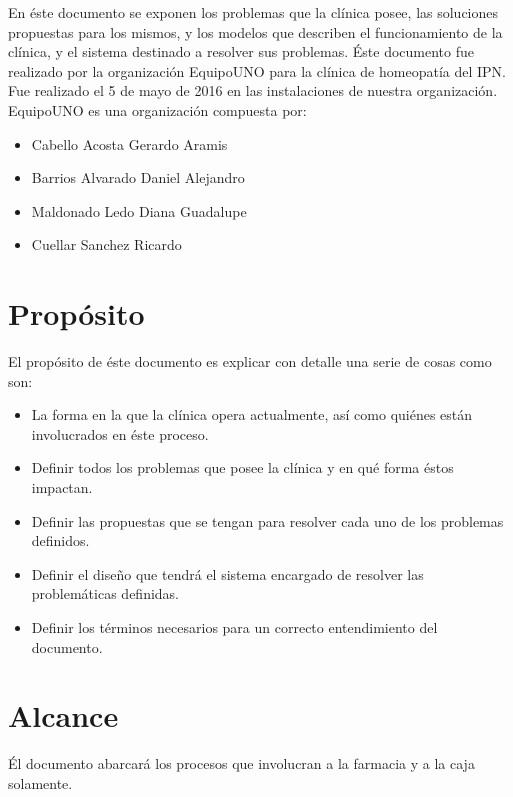 

En \'este documento se exponen los problemas que la cl\'inica posee, las soluciones propuestas para los mismos, y los modelos que describen el funcionamiento de la cl\'inica, y el sistema destinado a resolver sus problemas. 
\'Este documento fue realizado por la organizaci\'on EquipoUNO para la cl\'inica de homeopat\'ia del IPN. Fue realizado el 5 de mayo de 2016 en las instalaciones de nuestra organizaci\'on.
EquipoUNO es una organizaci\'on compuesta por:
\begin{itemize}
\item Cabello Acosta Gerardo Aramis
\item Barrios Alvarado Daniel Alejandro
\item Maldonado Ledo Diana Guadalupe
\item Cuellar Sanchez Ricardo
\end{itemize}

\section{Propósito}
El prop\'osito de \'este documento es explicar con detalle una serie de cosas como son:
\begin{itemize}
\item La forma en la que la cl\'inica opera actualmente, as\'i como qui\'enes est\'an involucrados en \'este proceso.
\item Definir todos los problemas que posee la cl\'inica y en qu\'e forma \'estos impactan.
\item Definir las propuestas que se tengan para resolver cada uno de los problemas definidos.
\item Definir el diseño que tendr\'a el sistema encargado de resolver las problem\'aticas definidas.
\item Definir los t\'erminos necesarios para un correcto entendimiento del documento.
\end{itemize}

\section{Alcance}
\'El documento abarcar\'a los procesos que involucran a la farmacia y a la caja solamente.

